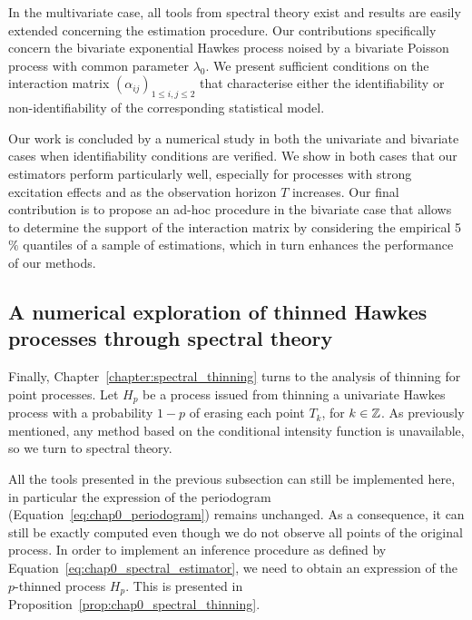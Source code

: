     In the multivariate case, all tools from spectral theory exist and results are easily extended concerning the estimation procedure.
    Our contributions specifically concern the bivariate exponential Hawkes process noised by a bivariate Poisson process with common parameter $\lambda_0$.
    We present sufficient conditions on the interaction matrix $(\alpha_{ij})_{1 \leq i,j \leq 2}$ that characterise either the identifiability or non-identifiability of the corresponding statistical model.

    Our work is concluded by a numerical study in both the univariate and bivariate cases when identifiability conditions are verified.
    We show in both cases that our estimators perform particularly well, especially for processes with strong excitation effects and as the observation horizon $T$ increases.
    Our final contribution is to propose an ad-hoc procedure in the bivariate case that allows to determine the support of the interaction matrix by considering the empirical 5$\%$ quantiles of a sample of estimations, which in turn enhances the performance of our methods.
    




    \subsection{A numerical exploration of thinned Hawkes processes through spectral theory}
    Finally, Chapter~\ref{chapter:spectral_thinning} turns to the analysis of thinning for point processes.
    Let $H_p$ be a process issued from thinning a univariate Hawkes process with a probability $1-p$ of erasing each point $T_k$, for $k\in{\mathbb Z}$.
    As previously mentioned, any method based on the conditional intensity function is unavailable, so we turn to spectral theory.

    All the tools presented in the previous subsection can still be implemented here, in particular the expression of the periodogram (Equation~\eqref{eq:chap0_periodogram}) remains unchanged. 
    As a consequence, it can still be exactly computed even though we do not observe all points of the original process.
    In order to implement an inference procedure as defined by Equation~\eqref{eq:chap0_spectral_estimator}, we need to obtain an expression of the $p$-thinned process $H_p$.
    This is presented in Proposition~\ref{prop:chap0_spectral_thinning}.

